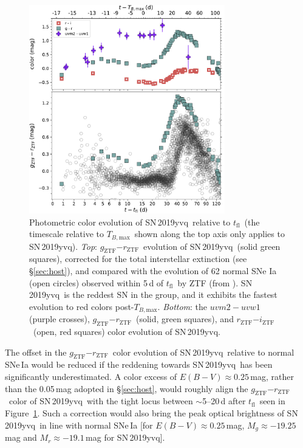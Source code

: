 \documentclass[twocolumn]{aastex63}
\newcommand{\rztf}{$r_\mathrm{ZTF}$}
\newcommand{\gztf}{$g_\mathrm{ZTF}$}
\newcommand{\iztf}{$i_\mathrm{ZTF}$}
\newcommand{\tfl}{$t_\mathrm{fl}$}
\newcommand{\tbmax}{$T_{B,\mathrm{max}}$}
\newcommand{\sn}{SN\,2019yvq}
\begin{document}
\begin{figure}
    \centering
    \includegraphics[width=3.35in]{./figures/P48_colors.pdf}
    \caption{Photometric color evolution of \sn\ relative to \tfl\ (the
    timescale relative to \tbmax\ shown along the top axis only applies to
    \sn). \textit{Top}: \gztf$ - $\rztf\ evolution of \sn\ (solid green
    squares), corrected for the total interstellar extinction (see
    \S\ref{sec:host}), and compared with the evolution of 62 normal SNe Ia
    (open circles) observed within 5\,d of \tfl\ by ZTF (from
    \citealt{Bulla20}). \sn\ is the reddest SN in the group, and it exhibits
    the fastest evolution to red colors post-\tbmax. \textit{Bottom}: the
    $uvm2 - uvw1$ (purple crosses), \gztf$ - $\rztf\ (solid, green squares),
    and \rztf$ - $\iztf\ (open, red squares) color evolution of \sn.}
    \label{fig:colors}
\end{figure}

The offset in the \gztf$ - $\rztf\ color evolution of \sn\ relative to normal
SNe\,Ia would be reduced if the reddening towards \sn\ has been significantly
underestimated. A color excess of $E(B-V) \approx 0.25$\,mag, rather than the
0.05\,mag adopted in \S\ref{sec:host}, would roughly align the \gztf$ -
$\rztf\ color of \sn\ with the tight locus between $\sim$5--20\,d after \tfl\
seen in Figure~\ref{fig:colors}. Such a correction would also bring the peak
optical brightness of \sn\ in line with normal SNe\,Ia [for $E(B-V) \approx
0.25$\,mag, $M_g \approx -19.25$\,mag and $M_r \approx -19.1$\,mag for \sn].
\end{document}
